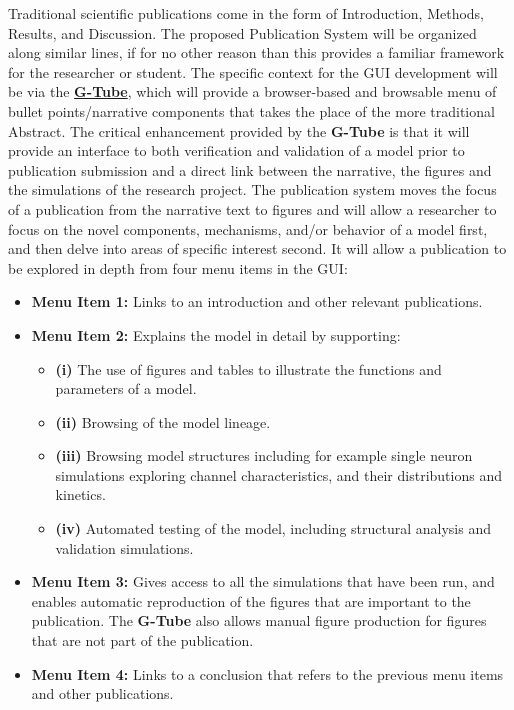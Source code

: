 \documentclass[12pt]{article}
\begin{document}
Traditional scientific publications come in the form of Introduction, Methods, Results, and Discussion. The proposed Publication System will be organized along similar lines, if for no other reason than this provides a familiar framework for the researcher or student. The specific context for the GUI development will be via the \href{../gtube/gtube.tex}{\bf G-Tube}, which will provide a browser-based and browsable menu of bullet points/narrative components that takes the place of the more traditional Abstract.  The critical enhancement provided by the {\bf G-Tube} is that it will provide an interface to both verification and validation of a model prior to publication submission and a direct link between the narrative, the figures and the simulations of the research project. The publication system moves the focus of a publication from the narrative text to figures and will allow a researcher to focus on the novel components, mechanisms, and/or behavior of a model first, and then delve into areas of specific interest second. It will allow a publication to be explored in depth from four menu items in the GUI:
\begin{itemize}
   \item{\bf Menu Item 1:} Links to an introduction and other relevant publications.
   \item{\bf Menu Item 2:} Explains the model in detail by supporting:
   \begin{itemize}
	\item {\bf (i)} The use of figures and tables to illustrate the functions and parameters of a model.
	\item {\bf (ii)} Browsing of the model lineage.
	\item {\bf (iii)} Browsing model structures including for example single neuron simulations exploring channel characteristics, and their distributions and kinetics.
	\item {\bf (iv)} Automated testing of the model, including structural analysis and validation simulations.
   \end{itemize}	
   \item{\bf Menu Item 3:} Gives access to all the simulations that have been run, and enables automatic reproduction of the figures that are important to the publication. The {\bf G-Tube} also allows manual figure production for figures that are not part of the publication.
   \item{\bf Menu Item 4:} Links to a conclusion that refers to the previous menu items and other publications.
\end{itemize}
\end{document}

